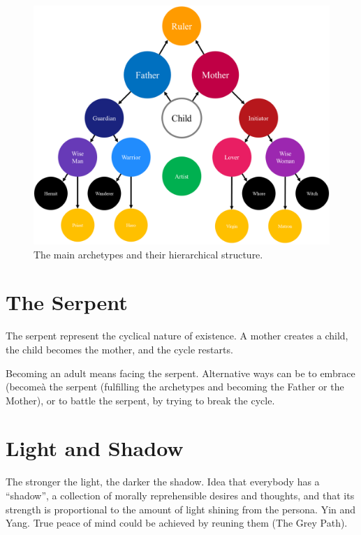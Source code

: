 \documentclass[]{book}
\begin{document}
\begin{figure}

{\centering \includegraphics[width=\textwidth]{img/archetypes} 

}

\caption{The main archetypes and their hierarchical structure.}\label{fig:unnamed-chunk-7}
\end{figure}

\hypertarget{the-serpent}{%
\section{The Serpent}\label{the-serpent}}

The serpent represent the cyclical nature of existence. A mother creates a child, the child becomes the mother, and the cycle restarts.

Becoming an adult means facing the serpent. Alternative ways can be to embrace (becomeà the serpent (fulfilling the archetypes and becoming the Father or the Mother), or to battle the serpent, by trying to break the cycle.

\hypertarget{light-and-shadow}{%
\section{Light and Shadow}\label{light-and-shadow}}

The stronger the light, the darker the shadow.
Idea that everybody has a ``shadow'', a collection of morally reprehensible desires and thoughts, and that its strength is proportional to the amount of light shining from the persona. Yin and Yang. True peace of mind could be achieved by reuning them (The Grey Path).
\end{document}
